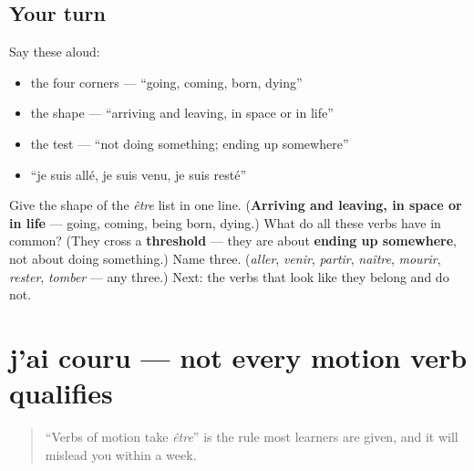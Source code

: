 \subsection*{Your turn}
Say these aloud:

\begin{itemize}
\raggedright
  \item the four corners — \textquotedblleft{}going, coming, born, dying\textquotedblright{}
  \item the shape — \textquotedblleft{}arriving and leaving, in space or in life\textquotedblright{}
  \item the test — \textquotedblleft{}not doing something; ending up somewhere\textquotedblright{}
  \item \textquotedblleft{}je suis allé, je suis venu, je suis resté\textquotedblright{}
\end{itemize}

\begin{tcolorbox}[breakable,colback=teal!4,colframe=teal!35!black,title={Before you move on}]
Give the shape of the \emph{être} list in one line. (\textbf{Arriving and leaving, in space or in life} — going, coming, being born, dying.) What do all these verbs have in common? (They cross a \textbf{threshold} — they are about \textbf{ending up somewhere}, not about doing something.) Name three. (\emph{aller}, \emph{venir}, \emph{partir}, \emph{naître}, \emph{mourir}, \emph{rester}, \emph{tomber} — any three.) Next: the verbs that look like they belong and do not.
\end{tcolorbox}
\section[j'ai couru]{j'ai couru — not every motion verb qualifies}

\label{lesson:FR-C16-pas-tout-mouvement}



\begin{quote}
\textquotedblleft{}Verbs of motion take \emph{être}\textquotedblright{} is the rule most learners are given, and it will mislead you within a week.
\end{quote}

